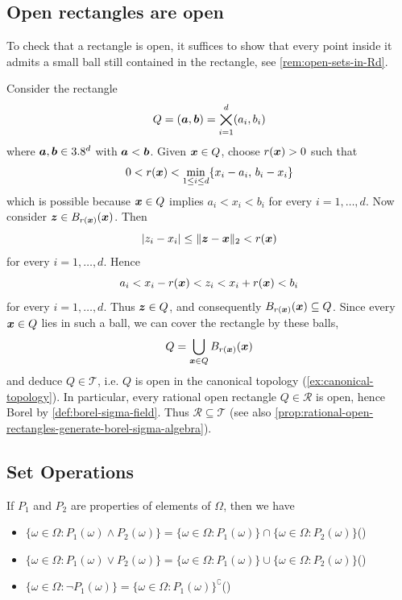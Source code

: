 \subsection*{Open rectangles are open}

To check that a rectangle is open, it suffices to show that every point inside it admits a small ball still contained in the rectangle, see \autoref{rem:open-sets-in-Rd}.

Consider the rectangle
\[
Q=({\boldsymbol{a}},{\boldsymbol{b}})=\bigtimes_{i=1}^d(a_i,b_i)
\]
where ${\boldsymbol{a}},{\boldsymbol{b}}\in3.8^d$ with ${\boldsymbol{a}}<{\boldsymbol{b}}$.
Given ${\boldsymbol{x}}\in Q$, choose $r({\boldsymbol{x}})>0$ such that
\[
0<r({\boldsymbol{x}})<\min_{1\leq i\leq d}\{x_i-a_i,\, b_i-x_i\}
\]
which is possible because ${\boldsymbol{x}}\in Q$ implies $a_i<x_i<b_i$ for every $i=1,\dots,d$.
Now consider ${\boldsymbol{z}} \allowbreak \in \allowbreak B_{r({\boldsymbol{x}})}({\boldsymbol{x}})$.
Then
\[
|z_i-x_i|
\leq
\|{\boldsymbol{z}}-{\boldsymbol{x}}\|_2
<
r({\boldsymbol{x}})
\]
for every $i=1,\dots,d$.
Hence
\[
a_i<x_i-r({\boldsymbol{x}})<z_i<x_i+r({\boldsymbol{x}})<b_i
\]
for every $i=1,\dots,d$.
Thus ${\boldsymbol{z}}\in Q$, and consequently
\(
B_{r({\boldsymbol{x}})}({\boldsymbol{x}})\subseteq Q
\).
Since every ${\boldsymbol{x}}\in Q$ lies in such a ball, we can cover the rectangle by these balls,
\[
Q
=
\bigcup_{{\boldsymbol{x}}\in Q} B_{r({\boldsymbol{x}})}({\boldsymbol{x}})
\]
and deduce $Q\in\mathcal{T}$, i.e. $Q$ is open in the canonical topology (\autoref{ex:canonical-topology}).
In particular, every rational open rectangle $Q\in\mathcal{R}$ is open, hence Borel by \autoref{def:borel-sigma-field}.
Thus $\mathcal{R}\subseteq\mathcal{T}$ (see also \autoref{prop:rational-open-rectangles-generate-borel-sigma-algebra}).





\subsection*{Set Operations}



If $P_1$ and $P_2$ are properties of elements of $\Omega$, then we have
\begin{itemize}
\item
{}\label{eq:set-ops-and}
\(
\{\omega \in \Omega : P_1(\omega) \land P_2(\omega)\} = \{\omega \in \Omega : P_1(\omega)\} \cap \{\omega \in \Omega : P_2(\omega)\}
\)\hfill\textup{(\theequation)}
\item
{}\label{eq:set-ops-or}
\(
\{\omega \in \Omega : P_1(\omega) \lor P_2(\omega)\} = \{\omega \in \Omega : P_1(\omega)\} \cup \{\omega \in \Omega : P_2(\omega)\}
\)\hfill\textup{(\theequation)}
\item 
{}\label{eq:set-ops-not}
\(
\{\omega \in \Omega : \neg P_1(\omega)\} = \{\omega \in \Omega : P_1(\omega)\}^\complement
\)\hfill\textup{(\theequation)}
\end{itemize}


